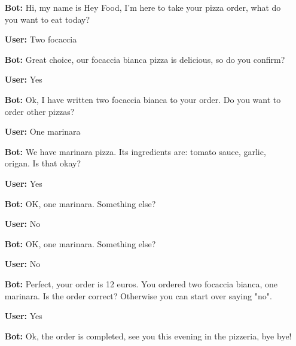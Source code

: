 \begin{itemize}

\item[\textbf{Bot:}]
Hi, my name is Hey Food, I'm here to take your pizza order, what do you want to eat today?

\item[\textbf{User:}] Two focaccia

\item[\textbf{Bot:}] Great choice, our focaccia bianca pizza is delicious, so do you confirm?

\item[\textbf{User:}]Yes

\item[\textbf{Bot:}] Ok, I have written two focaccia bianca to your order. Do you want to order other pizzas?

\item[\textbf{User:}] One marinara

\item[\textbf{Bot:}] We have marinara pizza. Its ingredients are: tomato sauce, garlic, origan. Is that okay?

\item[\textbf{User:}] Yes

\item[\textbf{Bot:}] OK, one marinara. Something else?

\item[\textbf{User:}] No

\item[\textbf{Bot:}] OK, one marinara. Something else?

\item[\textbf{User:}] No

\item[\textbf{Bot:}] Perfect, your order is 12 euros. You ordered two focaccia bianca, one marinara. Is the order correct? Otherwise you can start over saying "no".

\item[\textbf{User:}] Yes

\item[\textbf{Bot:}] Ok, the order is completed, see you this evening in the pizzeria, bye bye!

\end{itemize}